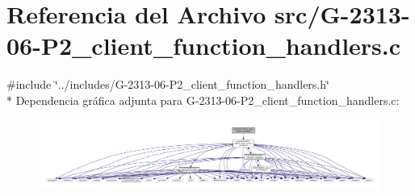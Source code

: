 \hypertarget{G-2313-06-P2__client__function__handlers_8c}{}\section{Referencia del Archivo src/\+G-\/2313-\/06-\/\+P2\+\_\+client\+\_\+function\+\_\+handlers.c}
\label{G-2313-06-P2__client__function__handlers_8c}
{\ttfamily \#include \char`\"{}../includes/\+G-\/2313-\/06-\/\+P2\+\_\+client\+\_\+function\+\_\+handlers.\+h\char`\"{}}\\*
Dependencia gráfica adjunta para G-\/2313-\/06-\/\+P2\+\_\+client\+\_\+function\+\_\+handlers.c\+:\nopagebreak
\begin{figure}[H]
\begin{center}
\leavevmode
\includegraphics[width=350pt]{G-2313-06-P2__client__function__handlers_8c__incl}
\end{center}
\end{figure}
